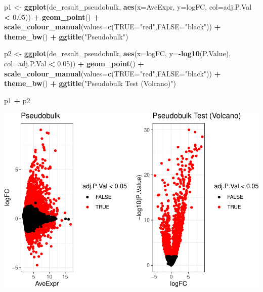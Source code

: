 \documentclass[
]{book}
\newenvironment{Shaded}{\begin{snugshade}}{\end{snugshade}}
\newcommand{\AttributeTok}[1]{\textcolor[rgb]{0.13,0.29,0.53}{#1}}
\newcommand{\FloatTok}[1]{\textcolor[rgb]{0.00,0.00,0.81}{#1}}
\newcommand{\FunctionTok}[1]{\textcolor[rgb]{0.13,0.29,0.53}{\textbf{#1}}}
\newcommand{\NormalTok}[1]{#1}
\newcommand{\OtherTok}[1]{\textcolor[rgb]{0.56,0.35,0.01}{#1}}
\newcommand{\SpecialCharTok}[1]{\textcolor[rgb]{0.81,0.36,0.00}{\textbf{#1}}}
\newcommand{\StringTok}[1]{\textcolor[rgb]{0.31,0.60,0.02}{#1}}
\begin{document}
\begin{Shaded}
\begin{Highlighting}[]
\NormalTok{p1 }\OtherTok{\textless{}{-}} \FunctionTok{ggplot}\NormalTok{(de\_result\_pseudobulk, }\FunctionTok{aes}\NormalTok{(}\AttributeTok{x=}\NormalTok{AveExpr, }\AttributeTok{y=}\NormalTok{logFC, }\AttributeTok{col=}\NormalTok{adj.P.Val }\SpecialCharTok{\textless{}} \FloatTok{0.05}\NormalTok{)) }\SpecialCharTok{+}
  \FunctionTok{geom\_point}\NormalTok{() }\SpecialCharTok{+}
  \FunctionTok{scale\_colour\_manual}\NormalTok{(}\AttributeTok{values=}\FunctionTok{c}\NormalTok{(}\StringTok{\textquotesingle{}TRUE\textquotesingle{}}\OtherTok{=}\StringTok{"red"}\NormalTok{,}\StringTok{\textquotesingle{}FALSE\textquotesingle{}}\OtherTok{=}\StringTok{"black"}\NormalTok{)) }\SpecialCharTok{+} 
  \FunctionTok{theme\_bw}\NormalTok{() }\SpecialCharTok{+}
  \FunctionTok{ggtitle}\NormalTok{(}\StringTok{"Pseudobulk"}\NormalTok{)}


\NormalTok{p2 }\OtherTok{\textless{}{-}} \FunctionTok{ggplot}\NormalTok{(de\_result\_pseudobulk, }\FunctionTok{aes}\NormalTok{(}\AttributeTok{x=}\NormalTok{logFC, }\AttributeTok{y=}\SpecialCharTok{{-}}\FunctionTok{log10}\NormalTok{(P.Value), }\AttributeTok{col=}\NormalTok{adj.P.Val }\SpecialCharTok{\textless{}} \FloatTok{0.05}\NormalTok{)) }\SpecialCharTok{+}
  \FunctionTok{geom\_point}\NormalTok{() }\SpecialCharTok{+}
  \FunctionTok{scale\_colour\_manual}\NormalTok{(}\AttributeTok{values=}\FunctionTok{c}\NormalTok{(}\StringTok{\textquotesingle{}TRUE\textquotesingle{}}\OtherTok{=}\StringTok{"red"}\NormalTok{,}\StringTok{\textquotesingle{}FALSE\textquotesingle{}}\OtherTok{=}\StringTok{"black"}\NormalTok{)) }\SpecialCharTok{+} 
  \FunctionTok{theme\_bw}\NormalTok{() }\SpecialCharTok{+}
  \FunctionTok{ggtitle}\NormalTok{(}\StringTok{"Pseudobulk Test (Volcano)"}\NormalTok{)}

\NormalTok{p1 }\SpecialCharTok{+}\NormalTok{ p2}
\end{Highlighting}
\end{Shaded}

\includegraphics{scRNAseqInR_ABACBS_2024_Doco_files/figure-latex/unnamed-chunk-58-1.pdf}
\end{document}

